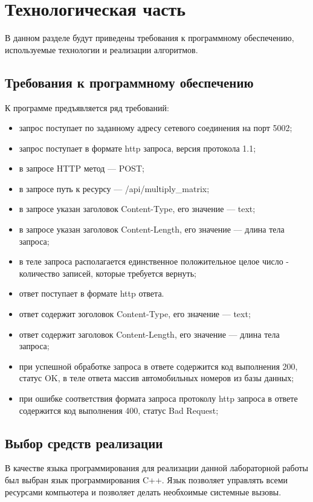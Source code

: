 \chapter{Технологическая часть}

В данном разделе будут приведены требования к программному обеспечению, используемые технологии и реализации алгоритмов.

\section{Требования к программному обеспечению}

К программе предъявляется ряд требований:

\begin{itemize}
	\item запрос поступает по заданному адресу сетевого соединения на порт 5002;
	\item запрос поступает в формате http запроса, версия протокола 1.1;
	\item в запросе HTTP метод — POST;
	\item в запросе путь к ресурсу — /api/multiply\_matrix;
	\item в запросе указан заголовок Content-Type, его значение — text;
	\item в запросе указан заголовок Content-Length, его значение — длина тела запроса;
	\item в теле запроса располагается единственное положительное целое число - количество записей, которые требуется вернуть;
	\item ответ поступает в формате http ответа.
	\item ответ содержит зоголовок Content-Type, его значение — text;
	\item ответ содержит заголовок Content-Length, его значение — длина тела запроса;
	\item при успешной обработке запроса в ответе содержится код выполнения 200, статус OK, в теле ответа массив автомобильных номеров из базы данных;
	\item при ошибке соответствия формата запроса протоколу http запроса в ответе содержится код выполнения 400, статус Bad Request;
\end{itemize}

\section{Выбор средств реализации}

В качестве языка программирования для реализации данной лабораторной работы был выбран язык программирования C++\cite{pythonlang}. Язык позволяет управлять всеми ресурсами компьютера и позволяет делать необхоимые системные вызовы.

